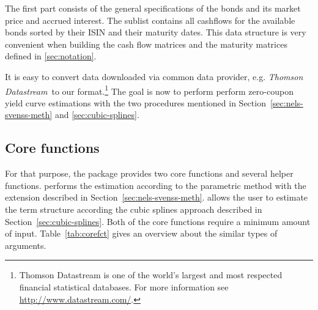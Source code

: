 The first part consists of the general specifications of the bonds and its market price and accrued interest. The sublist  contains all cashflows for the available bonds sorted by their ISIN and their maturity dates. This data structure is very convenient when building the cash flow matrices and the maturity matrices defined in \ref{sec:notation}.

It is easy to convert data downloaded via common data provider, e.g. \emph{Thomson Datastream}\texttrademark\, to our format.\footnote{Thomson Datastream is one of the world's largest and most respected financial statistical databases. For more information see \url{http://www.datastream.com/}.} The goal is now to perform perform zero-coupon yield curve estimations with the two procedures mentioned in Section~\ref{sec:nels-svenss-meth} and \ref{sec:cubic-splines}.

\newpage
\subsection{Core functions}
\label{sec:main-functions}

For that purpose, the package  provides two core functions and several helper functions.  performs the estimation according to the parametric \cite{Nelson1987} method with the \cite{Svensson1994} extension described in Section~\ref{sec:nels-svenss-meth}.   allows the user to estimate the term structure according the \cite{McCulloch1975} cubic splines approach described in Section~\ref{sec:cubic-splines}. Both of the core functions require a minimum amount of input. Table~\ref{tab:corefct} gives an overview about the similar types of arguments.

